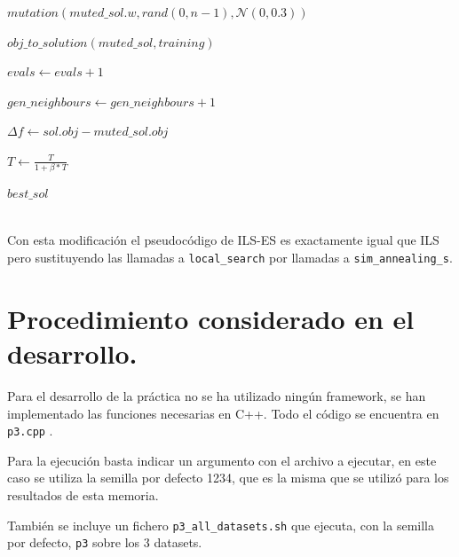\documentclass[11pt,a4paper]{article}
\theoremstyle{definition}
\begin{document}
\begin{algorithm}[H]
{{{					$mutation(muted\_sol.w, rand(0,n-1), \mathcal{N}(0,0.3))$
					
					$obj\_to\_solution(muted\_sol, training)$
					
					$evals \leftarrow evals+1$
					
					$gen\_neighbours \leftarrow gen\_neighbours +1 $
					
					$\Delta f \leftarrow sol.obj - muted\_sol.obj$
					
				}
				$T\leftarrow \frac{T}{1+\beta * T}$
			}
			
			\Return $best\_sol$
		}
	\end{algorithm}~\\
	
	Con esta modificación el pseudocódigo de ILS-ES es exactamente igual que ILS pero sustituyendo las llamadas a \texttt{local\_search} por llamadas a \texttt{sim\_annealing\_s}.
	\section{Procedimiento considerado en el desarrollo.}
	Para el desarrollo de la práctica no se ha utilizado ningún framework, se han implementado las funciones necesarias en C++. Todo el código se encuentra en \texttt{p3.cpp} .
	
	Para la ejecución basta indicar un argumento con el archivo a ejecutar, en este caso se utiliza la semilla por defecto 1234, que es la misma que se utilizó para los resultados de esta memoria.
	
	También se incluye un fichero \texttt{p3\_all\_datasets.sh} que ejecuta, con la semilla por defecto, \texttt{p3} sobre los 3 datasets.
	
\end{document}
